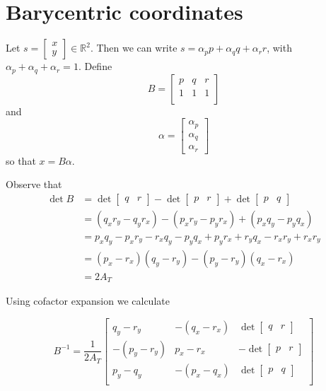 \documentclass[12pt]{amsart}
\begin{document}
\section*{Barycentric coordinates}

Let $s = \begin{bmatrix}x\\y\end{bmatrix}\in\mathbb{R}^2$. Then we can write $s = \alpha_p p + \alpha_q q + \alpha_r r$, with $\alpha_p + \alpha_q + \alpha_r = 1$. Define
\[ B = \left[\begin{array}{c|c|c}
p & q & r \\
1 & 1 & 1 \\
\end{array}\right] \]
and
\[\alpha = \left[\begin{array}{c}
\alpha_p \\ \alpha_q \\ \alpha_r
\end{array}\right]\]
so that $x = B\alpha$.

Observe that
\begin{align*}
\det B &= \det\left[\begin{array}{c|c} q & r \end{array}\right]
	- \det\left[\begin{array}{c|c} p & r \end{array}\right]
	+ \det\left[\begin{array}{c|c} p & q \end{array}\right] \\
	&= (q_xr_y - q_yr_x) - (p_xr_y - p_yr_x) + (p_xq_y - p_yq_x) \\
	&= p_xq_y - p_xr_y - r_xq_y - p_yq_x + p_yr_x + r_yq_x - r_xr_y + r_xr_y \\
	&= (p_x - r_x)(q_y - r_y) - (p_y - r_y)(q_x - r_x) \\
	&= 2A_T
\end{align*}

Using cofactor expansion we calculate

\[B^{-1} = \frac{1}{2A_T}\left[\begin{array}{ccc}
q_y - r_y & -(q_x - r_x) & \det\left[\begin{array}{c|c} q & r \end{array}\right] \\
-(p_y - r_y) & p_x - r_x & -\det\left[\begin{array}{c|c} p & r \end{array}\right] \\
p_y - q_y & -(p_x - q_x) & \det\left[\begin{array}{c|c} p & q \end{array}\right] \\
\end{array}\right]\]
\end{document}
